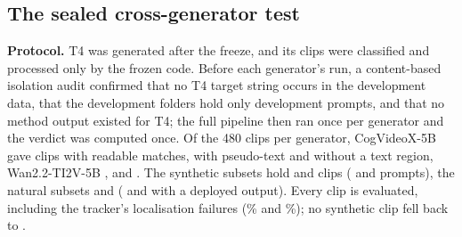 

\subsection{The sealed cross-generator test}
\label{sec:supp_g4_t4}
\textbf{Protocol.} T4 was generated after the freeze, and its clips were classified and processed only by the frozen code. Before each generator's run, a content-based isolation audit confirmed that no T4 target string occurs in the development data, that the development folders hold only development prompts, and that no method output existed for T4; the full pipeline then ran once per generator and the verdict was computed once. Of the 480 clips per generator, CogVideoX-5B gave \gTCogLone{} clips with readable matches, \gTCogLtwo{} with pseudo-text and \gTCogLthree{} without a text region, Wan2.2-TI2V-5B \gTWanLone, \gTWanLtwo{} and \gTWanLthree. The synthetic subsets hold \gTCogN{} and \gTWanN{} clips (\gTCogPrompts{} and \gTWanPrompts{} prompts), the natural subsets \gTCogNatAll{} and \gTWanNatAll{} (\gTCogNatN{} and \gTWanNatN{} with a deployed \method output). Every clip is evaluated, including the tracker's localisation failures (\gTCogLocFail\% and \gTWanLocFail\%); no synthetic clip fell back to \method.

